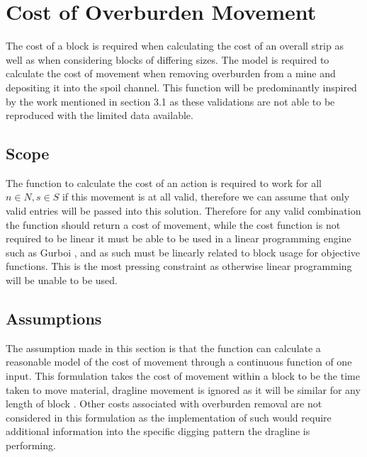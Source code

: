 \section{Cost of Overburden Movement}
The cost of a block is required when calculating the cost of an overall strip as well as when considering blocks of differing sizes. The model is required to calculate the cost of movement when removing overburden from a mine and depositing it into the spoil channel. This function will be predominantly inspired by the work mentioned in section 3.1 as these validations are not able to be reproduced with the limited data available. 
\subsection{Scope}
The function to calculate the cost of an action is required to work for all $n\in N , s \in S$ if this movement is at all valid, therefore we can assume that only valid entries will be passed into this solution. Therefore for any valid combination the function should return a cost of movement, while the cost function is not required to be linear it must be able to be used in a linear programming engine such as Gurboi \cite{gurobi}, and as such must be linearly related to block usage for objective functions. This is the most pressing constraint as otherwise linear programming will be unable to be used.
\subsection{Assumptions}
The assumption made in this section is that the function can calculate a reasonable model of the cost of movement through a continuous function of one input. This formulation takes the cost of movement within a block to be the time taken to move material, dragline movement is ignored as it will be similar for any length of block \cite{Costs}. Other costs associated with overburden removal are not considered in this formulation as the implementation of such would require additional information into the specific digging pattern the dragline is performing.

